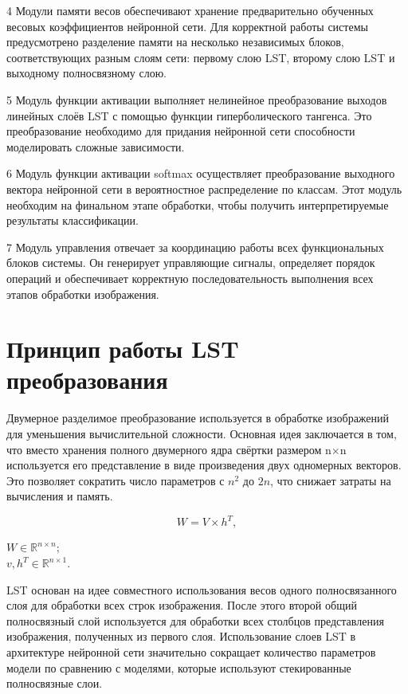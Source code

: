   4 Модули памяти весов обеспечивают хранение предварительно обученных весовых 
коэффициентов нейронной сети. Для корректной работы системы предусмотрено 
разделение памяти на несколько независимых блоков, соответствующих разным слоям 
сети: первому слою LST, второму слою LST и выходному полносвязному слою.

  5 Модуль функции активации выполняет нелинейное преобразование выходов 
линейных слоёв LST с помощью функции гиперболического тангенса. Это 
преобразование необходимо для придания нейронной сети способности моделировать 
сложные зависимости.

  6 Модуль функции активации softmax осуществляет преобразование выходного 
вектора нейронной сети в вероятностное распределение по классам. Этот модуль 
необходим на финальном этапе обработки, чтобы получить интерпретируемые 
результаты классификации.

  7 Модуль управления отвечает за координацию работы всех функциональных блоков 
системы. Он генерирует управляющие сигналы, определяет порядок операций и 
обеспечивает корректную последовательность выполнения всех этапов обработки 
изображения.

\section{Принцип работы LST преобразования}\par
\hspace*{12.5 mm}Двумерное разделимое преобразование используется в обработке 
изображений для уменьшения вычислительной сложности. Основная идея заключается 
в том, что вместо хранения полного двумерного ядра свёртки размером 
n\(\times\)n используется его представление в виде произведения двух одномерных 
векторов. Это позволяет сократить число параметров с \(n^2\) до \(2n\), что 
снижает затраты на вычисления и память.

\begin{equation}
    W = V \times h^T,
\end{equation}

 \(W\in \mathbb{R}^{n\times n}\);\\ 
\hphantom{где} \(v, h^T\in \mathbb{R}^{n\times 1}\).

LST основан на идее совместного использования весов одного полносвязанного 
слоя для обработки всех строк изображения. После этого второй общий 
полносвязный слой используется для обработки всех столбцов представления 
изображения, полученных из первого слоя. Использование слоев LST в архитектуре 
нейронной сети значительно сокращает количество параметров модели по сравнению 
с моделями, которые используют стекированные полносвязные слои.

